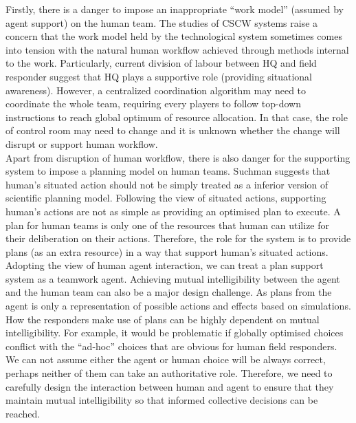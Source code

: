 Firstly, there is a danger to impose an inappropriate ``work model'' (assumed by agent support) on the human team. The studies of \ac{CSCW} systems \cite{Bowers1994} raise a concern that the work model held by the technological system sometimes comes into tension with the natural human workflow achieved through methods internal to the work. Particularly, current division of labour between HQ and field responder suggest that HQ plays a supportive role (providing situational awareness). However, a centralized coordination algorithm may need to coordinate the whole team, requiring every players to follow top-down instructions to reach global optimum of resource allocation. In that case, the role of control room may need to change and it is unknown whether the change will disrupt or support human workflow. \\

Apart from disruption of human workflow, there is also danger for the supporting system to impose a planning model on human teams. Suchman suggests that human's situated action should not be simply treated as a inferior version of scientific planning model. Following the view of situated actions, supporting human's actions are not as simple as providing an optimised plan to execute. A plan for human teams is only one of the resources that human can utilize for their deliberation on their actions. Therefore, the role for the system is to provide plans (as an extra resource) in a way that support human's situated actions. \\

Adopting the view of human agent interaction, we can treat a plan support system as a teamwork agent.  Achieving mutual intelligibility between the agent and the human team can also be a major design challenge.  As plans from the agent is only a representation of possible actions and effects based on simulations. How the responders make use of plans can be highly dependent on mutual intelligibility. For example, it would be problematic if globally optimised choices conflict with the ``ad-hoc'' choices that are obvious for human field responders. We can not assume either the agent or human choice will be always correct, perhaps neither of them can take an authoritative role. Therefore, we need to carefully design the interaction between human and agent to ensure that they maintain mutual intelligibility so that informed collective decisions can be reached.  \\



